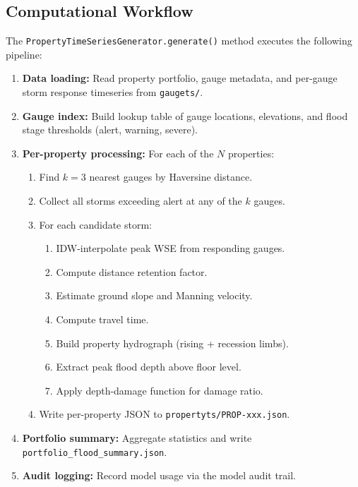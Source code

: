 \documentclass[11pt,a4paper]{article}
\begin{document}
\subsection{Computational Workflow}

The \texttt{PropertyTimeSeriesGenerator.generate()} method executes the following
pipeline:

\begin{enumerate}[nosep]
    \item \textbf{Data loading:} Read property portfolio, gauge metadata, and
          per-gauge storm response timeseries from \texttt{gaugets/}.
    \item \textbf{Gauge index:} Build lookup table of gauge locations, elevations,
          and flood stage thresholds (alert, warning, severe).
    \item \textbf{Per-property processing:} For each of the $N$ properties:
    \begin{enumerate}[nosep]
        \item Find $k = 3$ nearest gauges by Haversine distance.
        \item Collect all storms exceeding alert at any of the $k$ gauges.
        \item For each candidate storm:
        \begin{enumerate}[nosep]
            \item IDW-interpolate peak WSE from responding gauges.
            \item Compute distance retention factor.
            \item Estimate ground slope and Manning velocity.
            \item Compute travel time.
            \item Build property hydrograph (rising + recession limbs).
            \item Extract peak flood depth above floor level.
            \item Apply depth-damage function for damage ratio.
        \end{enumerate}
        \item Write per-property JSON to \texttt{propertyts/PROP-xxx.json}.
    \end{enumerate}
    \item \textbf{Portfolio summary:} Aggregate statistics and write
          \texttt{portfolio\_flood\_summary.json}.
    \item \textbf{Audit logging:} Record model usage via the model audit trail.
\end{enumerate}
\end{document}
